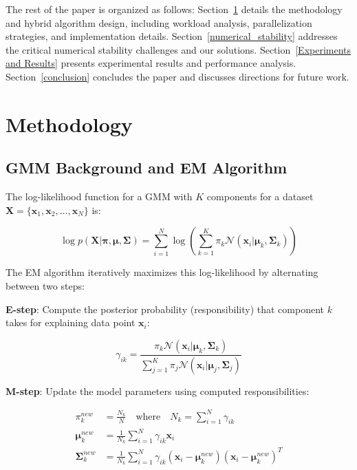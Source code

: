 \documentclass[conference]{IEEEtran}
\begin{document}
The rest of the paper is organized as follows: Section~\ref{methodology} details the methodology and hybrid algorithm design, including workload analysis, parallelization strategies, and implementation details. Section~\ref{numerical_stability} addresses the critical numerical stability challenges and our solutions. Section~\ref{Experiments and Results} presents experimental results and performance analysis. Section~\ref{conclusion} concludes the paper and discusses directions for future work.


\section{Methodology}
\label{methodology}

\subsection{GMM Background and EM Algorithm}

The log-likelihood function for a GMM with $K$ components for a dataset $\mathbf{X} = \{\mathbf{x}_1, \mathbf{x}_2, \ldots, \mathbf{x}_N\}$ is:

\begin{equation}
\log p(\mathbf{X}|\boldsymbol{\pi}, \boldsymbol{\mu}, \boldsymbol{\Sigma}) = \sum_{i=1}^{N} \log \left( \sum_{k=1}^{K} \pi_k \mathcal{N}(\mathbf{x}_i|\boldsymbol{\mu}_k, \boldsymbol{\Sigma}_k) \right)
\end{equation}

The EM algorithm iteratively maximizes this log-likelihood by alternating between two steps:

\textbf{E-step}: Compute the posterior probability (responsibility) that component $k$ takes for explaining data point $\mathbf{x}_i$:

\begin{equation}
\gamma_{ik} = \frac{\pi_k \mathcal{N}(\mathbf{x}_i|\boldsymbol{\mu}_k, \boldsymbol{\Sigma}_k)}{\sum_{j=1}^{K} \pi_j \mathcal{N}(\mathbf{x}_i|\boldsymbol{\mu}_j, \boldsymbol{\Sigma}_j)}
\end{equation}

\textbf{M-step}: Update the model parameters using computed responsibilities:

\begin{align}
\pi_k^{new} &= \frac{N_k}{N} \quad \text{where} \quad N_k = \sum_{i=1}^{N} \gamma_{ik} \\
\boldsymbol{\mu}_k^{new} &= \frac{1}{N_k} \sum_{i=1}^{N} \gamma_{ik} \mathbf{x}_i \\
\boldsymbol{\Sigma}_k^{new} &= \frac{1}{N_k} \sum_{i=1}^{N} \gamma_{ik} (\mathbf{x}_i - \boldsymbol{\mu}_k^{new})(\mathbf{x}_i - \boldsymbol{\mu}_k^{new})^T
\end{align}
\end{document}
